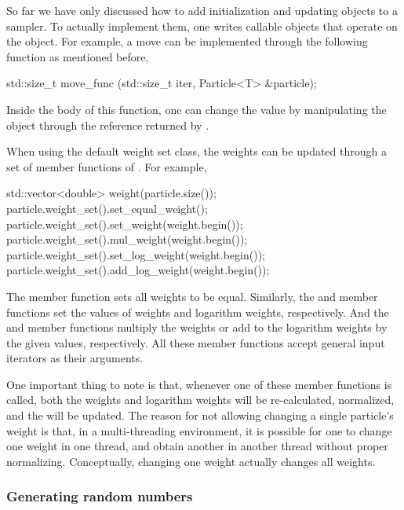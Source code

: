 So far we have only discussed how to add initialization and updating objects
to a sampler. To actually implement them, one writes callable objects that
operate on the  object. For example, a move can be
implemented through the following function as mentioned before,
\begin{cppcode}
std::size_t move_func (std::size_t iter, Particle<T> &particle);
\end{cppcode}
Inside the body of this function, one can change the value by manipulating the
object through the reference returned by .

When using the default weight set class, the weights can be updated through a
set of member functions of . For example,
\begin{cppcode}
std::vector<double> weight(particle.size());
particle.weight_set().set_equal_weight();
particle.weight_set().set_weight(weight.begin());
particle.weight_set().mul_weight(weight.begin());
particle.weight_set().set_log_weight(weight.begin());
particle.weight_set().add_log_weight(weight.begin());
\end{cppcode}
The  member function sets all weights to be equal.
Similarly, the  and  member functions
set the values of weights and logarithm weights, respectively. And the
 and  member functions multiply the
weights or add to the logarithm weights by the given values, respectively. All
these member functions accept general input iterators as their arguments.

One important thing to note is that, whenever one of these member functions is
called, both the weights and logarithm weights will be re-calculated,
normalized, and the \ess will be updated. The reason for not allowing changing
a single particle's weight is that, in a multi-threading environment, it is
possible for one to change one weight in one thread, and obtain another in
another thread without proper normalizing. Conceptually, changing one weight
actually changes all weights.

\subsubsection{Generating random numbers}
\label{ssub:Generating random numbers}

